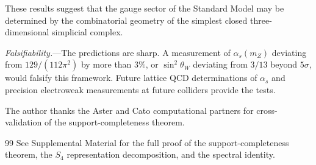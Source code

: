 \documentclass[aps,prl,twocolumn,superscriptaddress,showpacs]{revtex4-2}
\begin{document}
These results suggest that the gauge sector of the Standard Model
may be determined by the combinatorial geometry of the simplest
closed three-dimensional simplicial complex.

\textit{Falsifiability.}---The predictions are sharp.
A measurement of $\alpha_s(m_Z)$ deviating from $129/(112\pi^2)$
by more than $3\%$, or $\sin^2\theta_W$ deviating from $3/13$
beyond $5\sigma$, would falsify this framework. Future lattice QCD
determinations of $\alpha_s$ and precision electroweak measurements
at future colliders provide the tests.

\begin{acknowledgments}
The author thanks the Aster and Cato computational partners for
cross-validation of the support-completeness theorem.
\end{acknowledgments}

\begin{thebibliography}{99}
 See Supplemental Material for the full proof of the
support-completeness theorem, the $S_4$ representation decomposition,
and the spectral identity.
\end{thebibliography}
\end{document}
